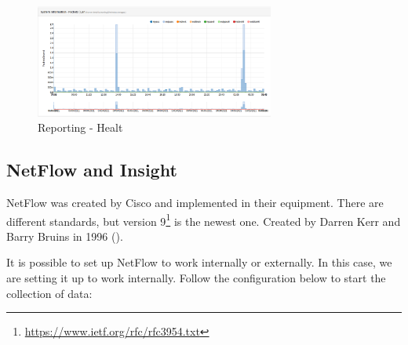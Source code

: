 \begin{figure}[h!]
    \centering
    \includegraphics[width=0.7\textwidth]{Images/reporting/health_overview.PNG}
    \caption{Reporting - Healt}
    \label{opnsense:reporting_health}
\end{figure}

\subsection{NetFlow and Insight} \label{netflow}
NetFlow was created by Cisco and implemented in their equipment. There are different standards, but version 9\footnote{\url{https://www.ietf.org/rfc/rfc3954.txt}} is the newest one. Created by Darren Kerr and Barry Bruins in 1996 (\cite{CiscoSystemsDivisionInternetTechnologies2005}).


It is possible to set up NetFlow to work internally or externally. In this case, we are setting it up to work internally. Follow the configuration below to start the collection of data:




